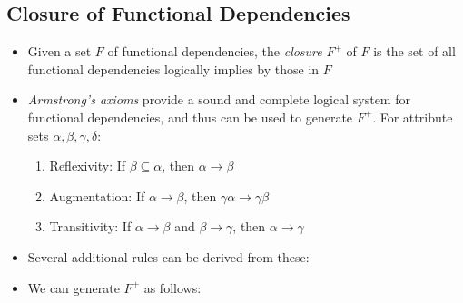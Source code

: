 \documentclass[a4paper]{article}
\begin{document}
\subsection{Closure of Functional Dependencies}
\begin{itemize}
\item Given a set $F$ of functional dependencies, the \emph{closure} $F^+$ of $F$ is the set of all functional dependencies logically implies by those in $F$
\item \emph{Armstrong's axioms} provide a sound and complete logical system for functional dependencies, and thus can be used to generate $F^+$. For attribute sets $\alpha,\beta,\gamma,\delta$:
\begin{enumerate}[label=(\roman*)]
\item Reflexivity: If $\beta\subseteq\alpha$, then $\alpha\rightarrow\beta$
\item Augmentation: If $\alpha\rightarrow\beta$, then $\gamma\alpha\rightarrow\gamma\beta$
\item Transitivity: If $\alpha\rightarrow\beta$ and $\beta\rightarrow\gamma$, then $\alpha\rightarrow\gamma$
\end{enumerate}
\item Several additional rules can be derived from these:
\item We can generate $F^+$ as follows:


\end{itemize}
\end{document}
